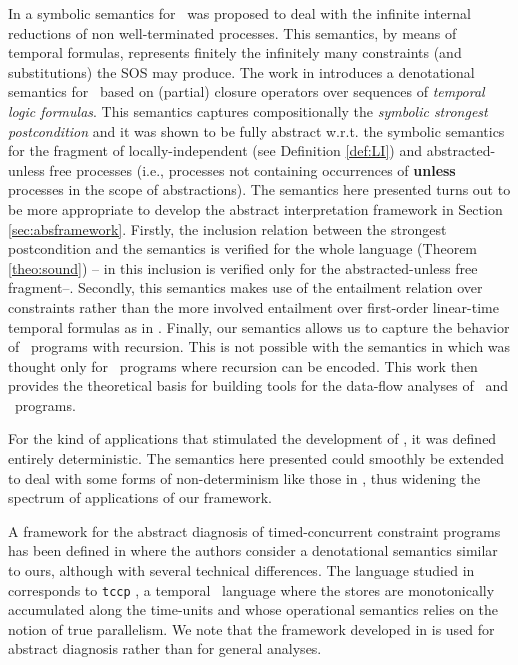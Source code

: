 \documentclass{tlp}
\begin{document}
In \cite{Olarte:08:SAC} a symbolic semantics for \utcc\ was proposed to deal with the infinite internal reductions of non well-terminated processes. This semantics, by means of temporal formulas, represents finitely  the infinitely many constraints (and substitutions) the  SOS may produce. The work in  \cite{Olarte:08:PPDP} introduces a denotational semantics for \utcc\ based on (partial) closure operators over sequences of \emph{temporal logic formulas}. This semantics captures compositionally the \emph{symbolic strongest postcondition} and it  was shown to be fully abstract w.r.t. the symbolic semantics for the fragment of locally-independent (see Definition \ref{def:LI}) and abstracted-unless free processes (i.e., processes not containing occurrences of {\bf unless} processes in the scope of abstractions). 
The semantics here presented turns out to be more appropriate to develop the abstract  interpretation framework in Section \ref{sec:absframework}. Firstly, the inclusion relation between the strongest postcondition  and the semantics  is verified for the whole language (Theorem \ref{theo:sound}) -- in \cite{Olarte:08:PPDP} this inclusion is verified 
only for the abstracted-unless free fragment--. Secondly, this semantics 
makes use of the  entailment relation over constraints rather than 
the more involved entailment  over  first-order linear-time temporal 
formulas as in \cite{Olarte:08:PPDP}. Finally, our semantics allows us to capture 
the behavior of \tccp\ programs with recursion. This is not possible with the 
semantics in \cite{Olarte:08:PPDP} which was thought only for \utcc\ programs 
where recursion can be encoded. 
This work then provides the theoretical basis for building  
tools for the data-flow analyses 
of \utcc\ and \tccp\ programs. 

For the kind of 
applications that stimulated the development of \utcc, it was defined entirely 
deterministic. The semantics 
here presented could smoothly be  extended to deal with some forms of 
non-determinism like those  in  \cite{Falaschi:97:TCS}, thus widening 
the spectrum of applications of  our framework. 








A framework for the abstract diagnosis of timed-concurrent constraint  programs
has been defined in \cite{CTV11} where the authors consider a denotational 
semantics similar to ours, although with several technical
differences. The language studied in \cite{CTV11} corresponds to \texttt{tccp} \cite{bgm99},  a  temporal \ccp\ language where the stores are monotonically accumulated along the time-units and whose operational semantics 
relies on the notion of true parallelism. We note that the framework developed in \cite{CTV11}  is used for abstract diagnosis rather than for  general analyses.
\end{document}
